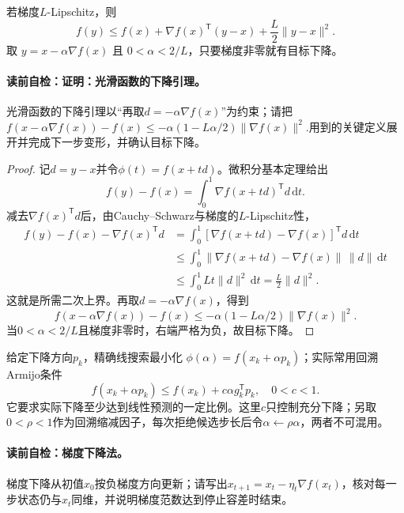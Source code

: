 \label{struct:V1-C08-CH12}
\begin{theorem}[光滑函数的下降引理]
若梯度$L$-Lipschitz，则
\[
f(y)\le f(x)+\nabla f(x)^{\mathsf T}(y-x)+\frac L2\|y-x\|^2.
\]
取 $y=x-\alpha\nabla f(x)$ 且 $0<\alpha<2/L$，只要梯度非零就有目标下降。
\end{theorem}
\label{struct:V1-C08-CH15}
\paragraph{读前自检：证明：光滑函数的下降引理。}光滑函数的下降引理以“再取$d=-\alpha\nabla f(x)$”为约束；请把$f(x-\alpha\nabla f(x))-f(x) \le-\alpha(1-L\alpha/2)\|\nabla f(x)\|^2.$用到的关键定义展开并完成下一步变形，并确认目标下降。\par

\begin{proof}
记$d=y-x$并令$\phi(t)=f(x+td)$。微积分基本定理给出
\[
f(y)-f(x)=\int_0^1\nabla f(x+td)^{\mathsf T}d\,\mathrm dt.
\]
减去$\nabla f(x)^{\mathsf T}d$后，由Cauchy--Schwarz与梯度的$L$-Lipschitz性，
\[
\begin{aligned}
f(y)-f(x)-\nabla f(x)^{\mathsf T}d
&=\int_0^1[\nabla f(x+td)-\nabla f(x)]^{\mathsf T}d\,\mathrm dt\\
&\le\int_0^1\|\nabla f(x+td)-\nabla f(x)\|\,\|d\|\,\mathrm dt\\
&\le\int_0^1Lt\|d\|^2\,\mathrm dt=\frac L2\|d\|^2.
\end{aligned}
\]
这就是所需二次上界。再取$d=-\alpha\nabla f(x)$，得到
\[
f(x-\alpha\nabla f(x))-f(x)
\le-\alpha(1-L\alpha/2)\|\nabla f(x)\|^2.
\]
当$0<\alpha<2/L$且梯度非零时，右端严格为负，故目标下降。
\end{proof}
给定下降方向$p_k$，精确线搜索最小化 $\phi(\alpha)=f(x_k+\alpha p_k)$；实际常用回溯Armijo条件
\[
f(x_k+\alpha p_k)\le f(x_k)+c\alpha g_k^{\mathsf T}p_k,
\quad 0<c<1.
\]
它要求实际下降至少达到线性预测的一定比例。这里$c$只控制充分下降；另取$0<\rho<1$作为回溯缩减因子，每次拒绝候选步长后令$\alpha\leftarrow\rho\alpha$，两者不可混用。
\paragraph{读前自检：梯度下降法。}梯度下降从初值$x_0$按负梯度方向更新；请写出$x_{t+1}=x_t-\eta_t\nabla f(x_t)$，核对每一步状态仍与$x_t$同维，并说明梯度范数达到停止容差时结束。\par


